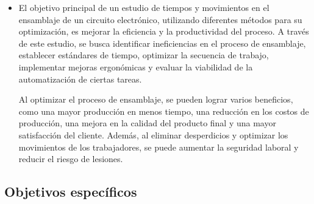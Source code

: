     \begin{itemize}
    
    \item El objetivo principal de un estudio de tiempos y movimientos en el ensamblaje de un circuito electrónico, utilizando diferentes métodos para su optimización, es mejorar la eficiencia y la productividad del proceso. A través de este estudio, se busca identificar ineficiencias en el proceso de ensamblaje, establecer estándares de tiempo, optimizar la secuencia de trabajo, implementar mejoras ergonómicas y evaluar la viabilidad de la automatización de ciertas tareas.
    
    Al optimizar el proceso de ensamblaje, se pueden lograr varios beneficios, como una mayor producción en menos tiempo, una reducción en los costos de producción, una mejora en la calidad del producto final y una mayor satisfacción del cliente. Además, al eliminar desperdicios y optimizar los movimientos de los trabajadores, se puede aumentar la seguridad laboral y reducir el riesgo de lesiones.\cite{Niebel2}
    
    \end{itemize}
    \subsection{Objetivos específicos }
    
